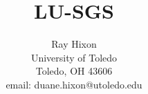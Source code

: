 \documentclass[12pt]{article}
\begin{document}
\begin{titlepage}
\title{
LU-SGS}


\author{
Ray Hixon \\
University of Toledo \\
Toledo, OH  43606 \\
email:  duane.hixon@utoledo.edu}

\date{}

\maketitle

\end{titlepage}





\end{document}
